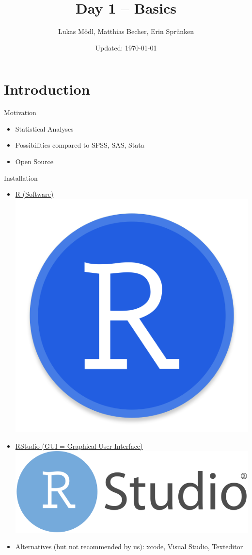 \documentclass[aspectratio = 169]{chariteBeamer}
\author[L. Mödl, M. Becher, E. Sprünken]{Lukas Mödl, Matthias Becher, Erin Sprünken}
\title{Day 1 -- Basics}
\date[]{Updated: \today}
\begin{document}
\begin{frame}[plain]
    \titlepage%
\end{frame}
\frame{\tableofcontents}



\section{Introduction}
\begin{frame}[fragile]{Motivation}
  \begin{itemize}
  \item Statistical Analyses
  \item Possibilities compared to SPSS, SAS, Stata
  \item Open Source
  \end{itemize}
\end{frame}


\begin{frame}{Installation}
	\begin{itemize}
		\item \href{https://www.r-project.org/}{R (Software)  \includegraphics[scale=0.01]{include/r-logo}}
		\item \href{https://www.rstudio.com/}{RStudio (GUI = Graphical User Interface)  \includegraphics[scale=0.04]{include/rstudio-logo}}
		\item Alternatives (but not recommended by us): xcode, Visual Studio, Texteditor
	\end{itemize}
	
\end{frame}
\end{document}
